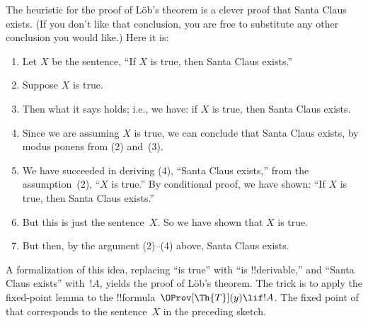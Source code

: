 \documentclass[../../../include/open-logic-section]{subfiles}
\begin{document}
\begin{explain}
The heuristic for the proof of L\"ob's theorem is a clever proof that
Santa Claus exists. (If you don't like that conclusion, you are free
to substitute any other conclusion you would like.) Here it is:
\begin{enumerate}
\item Let $X$ be the sentence, ``If $X$ is true, then Santa Claus
  exists.''
\item Suppose $X$ is true.
\item Then what it says holds; i.e., we have: if $X$ is true, then
  Santa Claus exists.
\item Since we are assuming $X$ is true, we can conclude that
  Santa Claus exists, by modus ponens from (2) and~(3).
\item We have succeeded in deriving (4), ``Santa Claus exists,'' from
  the assumption~(2), ``$X$ is true.'' By conditional proof, we have
  shown: ``If $X$ is true, then Santa Claus exists.''
\item But this is just the sentence~$X$. So we have shown that $X$ is
  true.
\item But then, by the argument (2)--(4) above, Santa Claus exists.
\end{enumerate}
A formalization of this idea, replacing ``is true'' with ``is
!!{derivable},'' and ``Santa Claus exists'' with~$!A$, yields the proof of
L\"ob's theorem. The trick is to apply the fixed-point lemma to the
!!{formula}~$\OProv[\Th{T}](y) \lif !A$. The fixed point of that
corresponds to the sentence~$X$ in the preceding sketch.
\end{explain}
\end{document}
